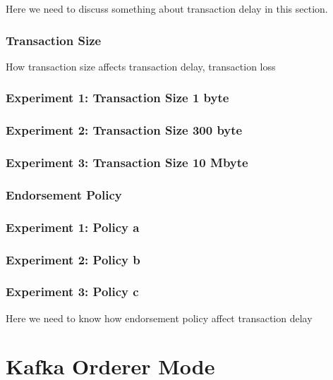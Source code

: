 \documentclass[10pt,journal,compsoc, twoside]{IEEEtran}
\begin{document}
Here we need to discuss something about transaction delay in this section. 


\subsubsection{Transaction Size}

How transaction size affects transaction delay, transaction loss

\subsubsection{Experiment 1: Transaction Size 1 byte}



\subsubsection{Experiment 2: Transaction Size 300 byte}



\subsubsection{Experiment 3: Transaction Size 10 Mbyte}








\subsubsection{Endorsement Policy} 

\subsubsection{Experiment 1: Policy a}


\subsubsection{Experiment 2: Policy b}


\subsubsection{Experiment 3: Policy c}

Here we need to know how endorsement policy affect transaction delay





\section{Kafka Orderer Mode}
\end{document}

